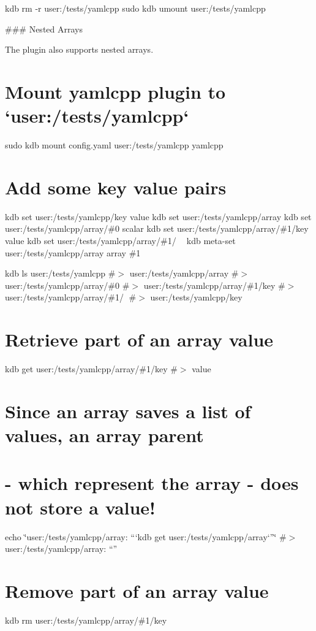 kdb rm -\/r user\+:/tests/yamlcpp sudo kdb umount user\+:/tests/yamlcpp 
\begin{DoxyCode}
### Nested Arrays

The plugin also supports nested arrays.
\end{DoxyCode}
 \hypertarget{autotoc_md807_autotoc_md835}{}\section{Mount yamlcpp plugin to `user\+:/tests/yamlcpp`}\label{autotoc_md807_autotoc_md835}
sudo kdb mount config.\+yaml user\+:/tests/yamlcpp yamlcpp\hypertarget{autotoc_md807_autotoc_md836}{}\section{Add some key value pairs}\label{autotoc_md807_autotoc_md836}
kdb set user\+:/tests/yamlcpp/key value kdb set user\+:/tests/yamlcpp/array kdb set user\+:/tests/yamlcpp/array/\#0 scalar kdb set user\+:/tests/yamlcpp/array/\#1/key value kdb set user\+:/tests/yamlcpp/array/\#1/🔑 🙈 kdb meta-\/set user\+:/tests/yamlcpp/array array \textquotesingle{}\#1\textquotesingle{}

kdb ls user\+:/tests/yamlcpp \#$>$ user\+:/tests/yamlcpp/array \#$>$ user\+:/tests/yamlcpp/array/\#0 \#$>$ user\+:/tests/yamlcpp/array/\#1/key \#$>$ user\+:/tests/yamlcpp/array/\#1/🔑 \#$>$ user\+:/tests/yamlcpp/key\hypertarget{autotoc_md807_autotoc_md837}{}\section{Retrieve part of an array value}\label{autotoc_md807_autotoc_md837}
kdb get user\+:/tests/yamlcpp/array/\#1/key \#$>$ value\hypertarget{autotoc_md807_autotoc_md838}{}\section{Since an array saves a list of values, an array parent}\label{autotoc_md807_autotoc_md838}
\hypertarget{autotoc_md807_autotoc_md839}{}\section{-\/ which represent the array -\/ does not store a value!}\label{autotoc_md807_autotoc_md839}
echo \char`\"{}user\+:/tests/yamlcpp/array\+: “`kdb get user\+:/tests/yamlcpp/array`”\char`\"{} \#$>$ user\+:/tests/yamlcpp/array\+: “”\hypertarget{autotoc_md807_autotoc_md840}{}\section{Remove part of an array value}\label{autotoc_md807_autotoc_md840}
kdb rm user\+:/tests/yamlcpp/array/\#1/key

